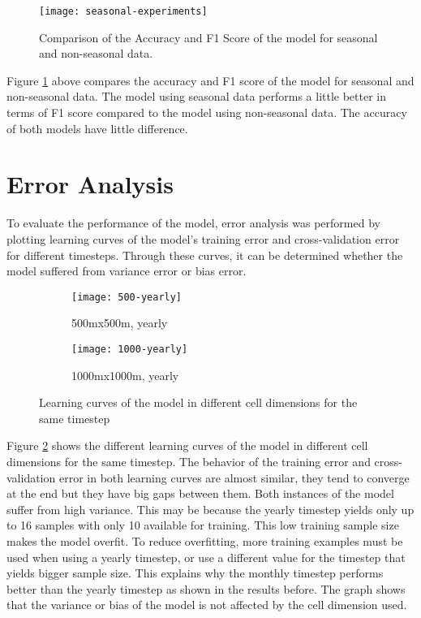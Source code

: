     \begin{figure}[H]
    \centering
    \texttt{[image: seasonal-experiments]}
    \caption{Comparison of the Accuracy and F1 Score of the model for seasonal and non-seasonal data.}
    \label{fig:seasonal-experiments}
    \end{figure}
    Figure \ref{fig:seasonal-experiments} above compares the accuracy and F1 score of the model for seasonal and non-seasonal data. The model using seasonal data performs a little better in terms of F1 score compared to the model using non-seasonal data. The accuracy of both models have little difference.

\section{Error Analysis}
    To evaluate the performance of the model, error analysis was performed by plotting learning curves of the model's training error and cross-validation error for different timesteps. Through these curves, it can be determined whether the model suffered from variance error or bias error.

    \begin{figure}[H]
    \centering
    \begin{subfigure}{.5\textwidth}
      \centering
      \texttt{[image: 500-yearly]}
      \caption{500mx500m, yearly}
    \end{subfigure}%
    \begin{subfigure}{.5\textwidth}
      \centering
      \texttt{[image: 1000-yearly]}
      \caption{1000mx1000m, yearly}
    \end{subfigure}
    \caption{Learning curves of the model in different cell dimensions for the same timestep}
    \label{fig:dimension-learning-curve}
    \end{figure}

    Figure \ref{fig:dimension-learning-curve} shows the different learning curves of the model in different cell dimensions for the same timestep. The behavior of the training error and cross-validation error in both learning curves are almost similar, they tend to converge at the end but they have big gaps between them. Both instances of the model suffer from high variance. This may be because the yearly timestep yields only up to 16 samples with only 10 available for training. This low training sample size makes the model overfit. To reduce overfitting, more training examples must be used when using a yearly timestep, or use a different value for the timestep that yields bigger sample size. This explains why the monthly timestep performs better than the yearly timestep as shown in the results before. The graph shows that the variance or bias of the model is not affected by the cell dimension used.

